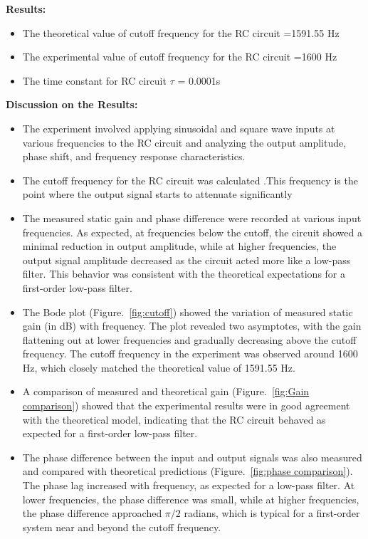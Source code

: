 \documentclass[11pt]{scrreprt}
\begin{document}
\noindent 

\noindent\textbf{ Results:}
\begin{itemize}

\item  The theoretical value of cutoff frequency for the RC circuit =1591.55 Hz 

\item  The experimental value of cutoff frequency for the RC circuit =1600 Hz

\item The time constant for RC circuit $\tau$ = 0.0001s
\end{itemize}

\noindent\textbf{Discussion on the Results:}
\begin{itemize}
\item The experiment involved applying sinusoidal and square wave inputs at various frequencies to the RC circuit and analyzing the output amplitude, phase shift, and frequency response characteristics.
\item The cutoff frequency for the RC circuit was calculated .This frequency is the point where the output signal starts to attenuate significantly
\item The measured static gain and phase difference were recorded at various input frequencies. As expected, at frequencies below the cutoff, the circuit showed a minimal reduction in output amplitude, while at higher frequencies, the output signal amplitude decreased as the circuit acted more like a low-pass filter. This behavior was consistent with the theoretical expectations for a first-order low-pass filter.
\item The Bode plot (Figure.~\ref{fig:cutoff}) showed the variation of measured static gain (in dB) with frequency. The plot revealed two asymptotes, with the gain flattening out at lower frequencies and gradually decreasing above the cutoff frequency. The cutoff frequency in the experiment was observed around 1600 Hz, which closely matched the theoretical value of 1591.55 Hz.
\item A comparison of measured and theoretical gain (Figure.~\ref{fig:Gain comparison}) showed that the experimental results were in good agreement with the theoretical model, indicating that the RC circuit behaved as expected for a first-order low-pass filter.
\item The phase difference between the input and output signals was also measured and compared with theoretical predictions (Figure.~\ref{fig:phase comparison}). The phase lag increased with frequency, as expected for a low-pass filter. At lower frequencies, the phase difference was small, while at higher frequencies, the phase difference approached $\pi/2$ radians, which is typical for a first-order system near and beyond the cutoff frequency.

\end{itemize}
\end{document}
